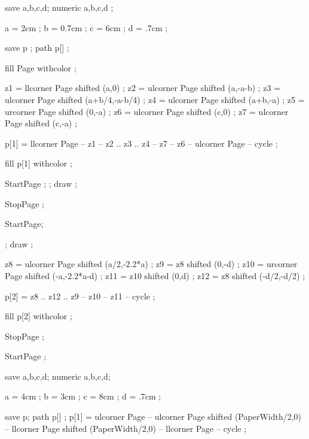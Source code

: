 save a,b,c,d;
numeric a,b,c,d ;

a = 2cm ;   b = 0.7cm ;
c = 6cm ;   d = .7cm ;

save p ; path p[] ;

fill Page withcolor  ;

z1 = llcorner Page shifted (a,0) ;
z2 = ulcorner Page shifted (a,-a-b) ;
z3 = ulcorner Page shifted (a+b/4,-a-b/4) ;
z4 = ulcorner Page shifted (a+b,-a) ;
z5 = urcorner Page shifted (0,-a) ;
z6 = ulcorner Page shifted (c,0) ;
z7 = ulcorner Page shifted (c,-a) ;


p[1] = llcorner Page -- z1 -- z2 .. z3 .. z4 -- z7 -- z6 -- 
       ulcorner Page -- cycle ;

fill p[1] withcolor  ;

\stopuseMPgraphic

StartPage ;
 ;
draw  ;

StopPage ;
\stopuseMPgraphic

StartPage;

 ;
draw  ;


z8 = ulcorner Page shifted (a/2,-2.2*a) ;
z9 = z8 shifted (0,-d) ;
z10 = urcorner Page shifted (-a,-2.2*a-d) ;
z11 = z10 shifted (0,d) ;
z12 = z8 shifted (-d/2,-d/2) ;

p[2] = z8 .. z12 .. z9 -- z10 -- z11 -- cycle ;

fill p[2] withcolor  ;

StopPage ;
\stopuseMPgraphic

StartPage ;

save a,b,c,d;
numeric a,b,c,d;

a = 4cm ;   b = 3cm ;
c = 8cm ;   d = .7cm ;

save p; path p[] ;
p[1] = ulcorner Page -- ulcorner Page shifted (PaperWidth/2,0) -- 
       llcorner Page shifted (PaperWidth/2,0) -- llcorner Page -- cycle ;

